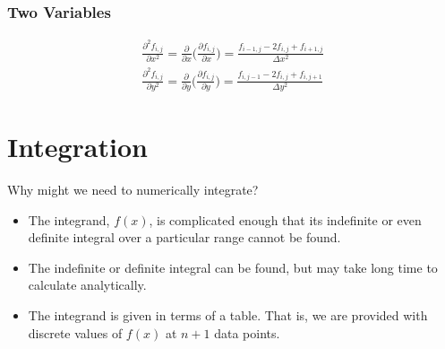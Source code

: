 \documentclass[12pt]{article}
\begin{document}
\subsubsection*{Two Variables}
\begin{align*}
\frac{\partial^2 f_{i,j}}{\partial x^2} = \frac{\partial}{\partial x}\bigl(\frac{\partial f_{i,j}}{\partial x}\bigr) =
\frac{f_{i-1,j} - 2f_{i,j} + f_{i+1,j}}{\Delta x^2} \\
%
\frac{\partial^2 f_{i,j}}{\partial y^2} = \frac{\partial}{\partial y}\bigl(\frac{\partial f_{i,j}}{\partial y}\bigr) =
\frac{f_{i,j-1} - 2f_{i,j} + f_{i,j+1}}{\Delta y^2}
\end{align*}
\begin{center}
\end{center}


\vspace*{-2em}
\section*{Integration}
Why might we need to numerically integrate?
\begin{itemize}
\item The integrand, $f(x)$, is complicated enough that its
indefinite or even definite integral over a particular range cannot
be found.
\item The indefinite or definite integral can be found, but may take
long time to calculate analytically.
\item The integrand is given in terms of a table. That is, we are
provided with discrete values of $f(x)$ at $n+1$ data points.
\end{itemize}
\end{document}
